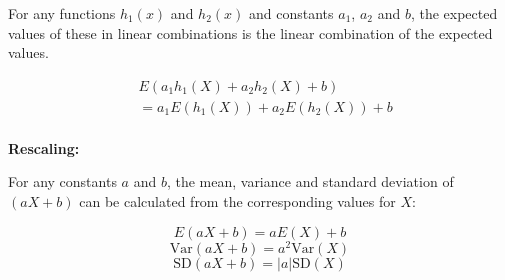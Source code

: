 For any functions $h_1(x)$ and $h_2(x)$ and constants $a_1$, $a_2$ and $b$, the expected values of these in linear combinations is the linear combination of the expected values.

\begin{align*}
     & E(a_1h_1(X) + a_2h_2(X) + b)      \\
     & = a_1E(h_1(X)) + a_2E(h_2(X)) + b \\
\end{align*}

\textbf{Rescaling:}

For any constants $a$ and $b$, the mean, variance and standard deviation of $(aX+b)$ can be calculated from the corresponding values for $X$:

$$ E(aX+b) = aE(X) + b $$
$$ \text{Var}(aX+b) = a^2\text{Var}(X) $$
$$ \text{SD}(aX+b) = |a|\text{SD}(X) $$